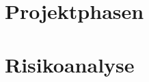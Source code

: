 
\begin{appendices}

	
	\section{Projektphasen}		
		
		\newpage

	\section{Risikoanalyse}		
		
		\newpage		

\end{appendices}